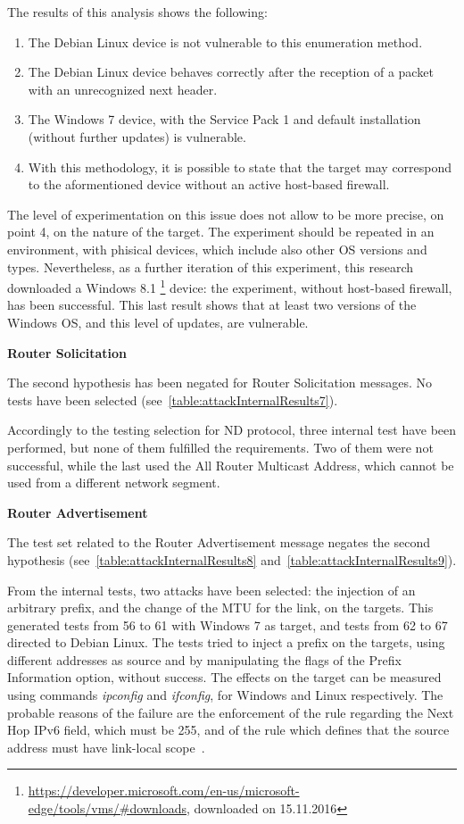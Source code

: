 \documentclass[12pt]{article}
\begin{document}
The results of this analysis shows the following:
\begin{enumerate}[noitemsep,topsep=0pt,partopsep=0pt]
 \item The Debian Linux device is not vulnerable to this enumeration method.
 \item The Debian Linux device behaves correctly after the reception of a packet with an unrecognized next header.
 \item The Windows 7 device, with the Service Pack 1 and default installation (without further updates) is vulnerable.
 \item With this methodology, it is possible to state that the target may correspond to the aformentioned device without an active host-based firewall.
\end{enumerate}

The level of experimentation on this issue does not allow to be more precise, on point 4, on the nature of the target. The experiment should be repeated in an environment, with phisical devices, which include also other OS versions and types. Nevertheless, as a further iteration of this experiment, this research downloaded a Windows 8.1 \footnote{\url{https://developer.microsoft.com/en-us/microsoft-edge/tools/vms/\#downloads}, downloaded on 15.11.2016} device: the experiment, without host-based firewall, has been successful. This last result shows that at least two versions of the Windows OS, and this level of updates, are vulnerable.

\textbf{Router Solicitation}


The second hypothesis has been negated for Router Solicitation messages. No tests have been selected (see~\cref{table:attackInternalResults7}). 

Accordingly to the testing selection for ND protocol, three internal test have been performed, but none of them fulfilled the requirements. Two of them were not successful, while the last used the All Router Multicast Address, which cannot be used from a different network segment.

\textbf{Router Advertisement}

The test set related to the Router Advertisement message negates the second hypothesis (see~\cref{table:attackInternalResults8} and~\cref{table:attackInternalResults9}).

From the internal tests, two attacks have been selected: the injection of an arbitrary prefix, and the change of the MTU for the link, on the targets. This generated tests from 56 to 61 with Windows 7 as target, and tests from 62 to 67 directed to Debian Linux. The tests tried to inject a prefix on the targets, using different addresses as source and by manipulating the flags of the Prefix Information option, without success. The effects on the target can be measured using commands \textit{ipconfig} and \textit{ifconfig}, for Windows and Linux respectively. The probable reasons of the failure are the enforcement of the rule regarding the Next Hop IPv6 field, which must be 255, and of the rule which defines that the source address must have link-local scope~\cite{rfc4861}.
\end{document}
